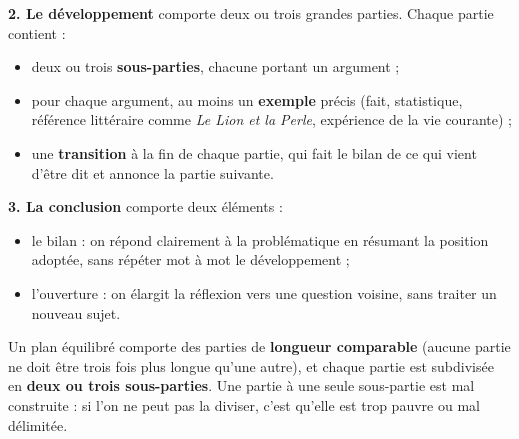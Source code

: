 \documentclass[11pt]{article}
\newcommand{\cle}[1]{{\popxbold\color{popdark}#1}}
\begin{document}
\textbf{2. Le développement} comporte deux ou trois grandes parties. Chaque partie contient :
\begin{itemize}
\item deux ou trois \textbf{sous-parties}, chacune portant un argument ;
\item pour chaque argument, au moins un \textbf{exemple} précis (fait, statistique, référence littéraire comme \emph{Le Lion et la Perle}, expérience de la vie courante) ;
\item une \textbf{transition} à la fin de chaque partie, qui fait le bilan de ce qui vient d'être dit et annonce la partie suivante.
\end{itemize}

\textbf{3. La conclusion} comporte deux éléments :
\begin{itemize}
\item le \cle{bilan} : on répond clairement à la problématique en résumant la position adoptée, sans répéter mot à mot le développement ;
\item l'\cle{ouverture} : on élargit la réflexion vers une question voisine, sans traiter un nouveau sujet.
\end{itemize}

\begin{propriete}
Un plan équilibré comporte des parties de \textbf{longueur comparable} (aucune partie ne doit être trois fois plus longue qu'une autre), et chaque partie est subdivisée en \textbf{deux ou trois sous-parties}. Une partie à une seule sous-partie est mal construite : si l'on ne peut pas la diviser, c'est qu'elle est trop pauvre ou mal délimitée.
\end{propriete}
\end{document}

